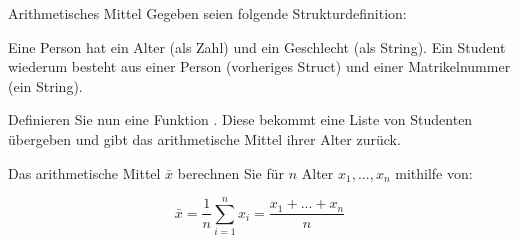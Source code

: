 \documentclass{../tuda-exercise}
\begin{document}
  \clearpagesolution

  \begin{task}[credit=\stars{3}{3}]{Arithmetisches Mittel}
    Gegeben seien folgende Strukturdefinition:

    

    Eine Person hat ein Alter (als Zahl) und ein Geschlecht (als String). Ein Student wiederum
    besteht aus einer Person (vorheriges Struct) und einer Matrikelnummer (ein String).

    \br

    Definieren Sie nun eine Funktion . Diese bekommt eine Liste von
    Studenten übergeben und gibt das arithmetische Mittel ihrer Alter zurück.

    \begin{note}[title=Hinweis:, color=tuda-orange]
      Das arithmetische Mittel \(\bar{x}\) berechnen Sie für \(n\) Alter \(x_1, ..., x_n\)
      mithilfe von:

      \begin{equation*}
        \bar{x} = \frac{1}{n} \sum_{i = 1}^n x_i = \frac{x_1 + ... + x_n}{n}
      \end{equation*}
    \end{note}

    \clearpagesolution

    \begin{solution}
      
    \end{solution}
  \end{task}
\end{document}
